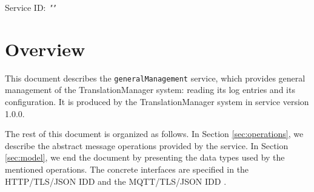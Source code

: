 \documentclass[a4paper]{arrowhead}
\begin{document}
\sloppy

\ArrowheadSetup

\begin{center}
  \vspace*{1cm}
  \huge{\arrowtitle}

  \vspace*{0.2cm}
  \LARGE{\arrowtype}
  \vspace*{1cm}

  \Large{Service ID: \textit{"\arrowid"}}

  \vspace*{\fill}


  \vspace*{1cm}
  \vspace*{\fill}

  \begin{abstract}
    This document describes the \texttt{generalManagement} service, version 1.0.0, produced by the TranslationManager support system of Arrowhead 5.2.2.
  \end{abstract}

  \vspace*{1cm}
\end{center}

\newpage

\tableofcontents
\newpage

\section{Overview}
\label{sec:overview}

This document describes the \texttt{generalManagement} service, which provides general management of the Translation\allowbreak{}Manager system: reading its log entries and its configuration.
It is produced by the TranslationManager system \cite{tm-sysd} in service version 1.0.0.

The rest of this document is organized as follows.
In Section \ref{sec:operations}, we describe the abstract message operations provided by the service.
In Section \ref{sec:model}, we end the document by presenting the data types used by the mentioned operations.
The concrete interfaces are specified in the HTTP/TLS/JSON IDD \cite{tm-generalManagement-http-idd} and the MQTT/TLS/JSON IDD \cite{tm-generalManagement-mqtt-idd}.
\end{document}

